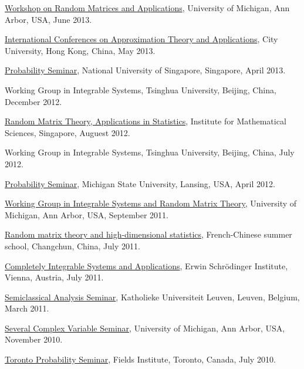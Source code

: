 \documentclass[12pt,a4paper]{article}
\newenvironment{item_list}{
 \begin{list}{}{
   \setlength{\leftmargin}{1.5em}
   \setlength{\itemsep}{0.25em}
   \setlength{\parskip}{0pt}
   \setlength{\parsep}{0.25em}
 }
}{
 \end{list}
}
\begin{document}
\begin{item_list}
\item
  \href{http://web.eecs.umich.edu/~rajnrao/rmt2013/}{Workshop on Random Matrices and Applications}, University of Michigan, Ann Arbor, USA, June 2013.
\item
  \href{http://www6.cityu.edu.hk/ma/maicata/}{International Conferences on Approximation Theory and Applications}, City University, Hong Kong, China, May 2013.
\item
  \href{http://www.math.nus.edu.sg/seminars.aspx?CatID=9}{Probability Seminar}, National University of Singapore, Singapore, April 2013.
\item
  Working Group in Integrable Systems, Tsinghua University, Beijing, China, December 2012.
\item
  \href{http://www2.ims.nus.edu.sg/Programs/012random/wk2.php}{Random Matrix Theory, Applications in Statistics}, Institute for Mathematical Sciences, Singapore, Auguest 2012.
\item
  Working Group in Integrable Systems, Tsinghua University, Beijing, China, July 2012.
\item
  \href{http://mathdata.msu.edu/Seminar/Recent.asp?s=928}{Probability Seminar}, Michigan State University, Lansing, USA, April 2012.
\item
  \href{http://www.math.lsa.umich.edu/seminars_events/events.php?eventdefid=43&dt_begin=2011-07-01&dt_end=2011-12-31}{Working Group in Integrable Systems and Random Matrix Theory}, University of Michigan, Ann Arbor, USA, September 2011.
\item
  \href{http://web.hku.hk/~jeffyao/ss/}{Random matrix theory and high-dimensional statistics},  French-Chinese summer school, Changchun, China, July 2011.
\item
  \href{http://www.esf.org/activities/esf-conferences/details/2011/confdetail369.html}{Completely Integrable Systems and Applications}, Erwin Schr\"{o}dinger Institute, Vienna, Austria, July 2011.
\item
  \href{http://wis.kuleuven.be/analyse/seminar-classical.html}{Semiclassical Analysis Seminar}, Katholieke Universiteit Leuven, Leuven, Belgium, March 2011.
\item
  \href{http://www.math.lsa.umich.edu/seminars/scv/}{Several Complex Variable Seminar}, University of Michigan, Ann Arbor, USA, November 2010.
\item
  \href{http://www.math.utoronto.ca/cms/toronto-probability-seminar/}{Toronto Probability Seminar}, Fields Institute, Toronto, Canada, July 2010.
\item

\end{item_list}
\end{document}

